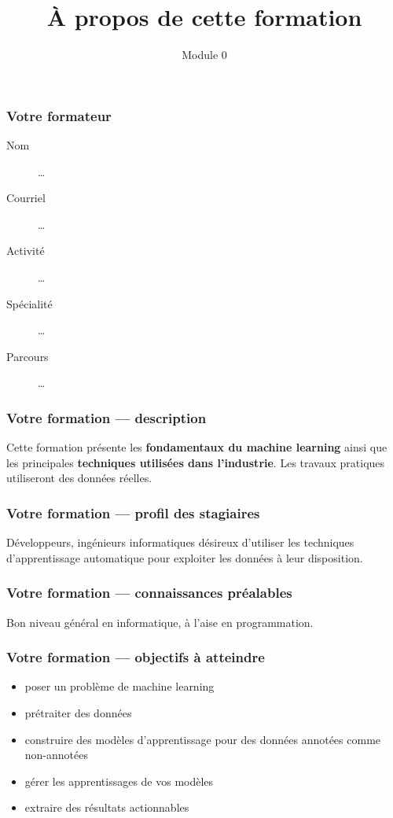 \documentclass{formation}
\title{À propos de cette formation}
\subtitle{Module 0}
\begin{document}
\maketitle

\begin{frame}
  \frametitle{Votre formateur}
  \begin{description}
  \item[Nom] …
  \item[Courriel] …
  \item[Activité] …
  \item[Spécialité] …
  \item[Parcours] …
  \end{description}
\end{frame}

\begin{frame}
  \frametitle{Votre formation — description}

  Cette formation présente les \textbf{fondamentaux du machine
    learning} ainsi que les principales \textbf{techniques utilisées
    dans l’industrie}. Les travaux pratiques utiliseront des données
  réelles.
\end{frame}

\begin{frame}
  \frametitle{Votre formation — profil des stagiaires}

  Développeurs, ingénieurs informatiques désireux d’utiliser les
  techniques d’apprentissage automatique pour exploiter les données à
  leur disposition.
\end{frame}

\begin{frame}
  \frametitle{Votre formation — connaissances préalables}

  Bon niveau général en informatique, à l’aise en programmation.
\end{frame}

\begin{frame}
  \frametitle{Votre formation — objectifs à atteindre}

  \begin{itemize}
  \item poser un problème de machine learning
  \item prétraiter des données
  \item construire des modèles d'apprentissage pour des données
    annotées comme non-annotées
  \item gérer les apprentissages de vos modèles
  \item extraire des résultats actionnables
  \end{itemize}
\end{frame}
\end{document}
